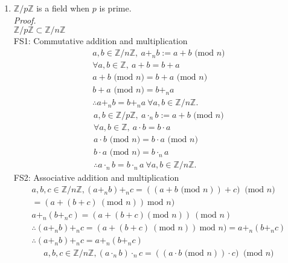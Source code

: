 \documentclass{article}
\begin{document}
\begin{enumerate}
\begin{enumerate}
        \vspace{5mm}
        \item $\mathbb{Z} / p\mathbb{Z}$ is a field when $p$ is prime. \\
        \textit{Proof.} \\
        $\mathbb{Z}/p\mathbb{Z} \subset \mathbb{Z}/n\mathbb{Z}$ \\
        FS1: Commutative addition and multiplication
        \begin{gather*}
            a, b \in \mathbb{Z}/n\mathbb{Z}, \ a +_n b := a + b \textrm{ (mod } n) \\
            \forall a,b \in \mathbb{Z}, \ a + b = b + a \\
            a + b \textrm{ (mod } n) = b + a \textrm{ (mod } n) \\
            b + a \textrm{ (mod } n) = b +_n a \\
            \therefore  a +_n b = b +_n a \ \forall a,b \in \mathbb{Z}/n\mathbb{Z}.
        \end{gather*}
        \begin{gather*}
            a, b \in \mathbb{Z}/p\mathbb{Z}, \ a \cdot_n b := a + b \textrm{ (mod } n) \\
            \forall a,b \in \mathbb{Z}, \ a \cdot b = b \cdot a \\
            a \cdot b \textrm{ (mod } n) = b \cdot a \textrm{ (mod } n) \\
            b \cdot a \textrm{ (mod } n) = b \cdot_n a \\
            \therefore  a \cdot_n b = b \cdot_n a \ \forall a,b \in \mathbb{Z}/n\mathbb{Z}.
        \end{gather*}
        FS2: Associative addition and multiplication
        \begin{gather*}
            a,b,c \in \mathbb{Z}/n\mathbb{Z}, (a +_n b) +_n c = ((a + b \textrm{ (mod } n)) + c)  \ \textrm{ (mod } n) \\
            = (a + (b+c) \  (\textrm{mod } n)) \ \textrm{mod } n) \\
            a +_n (b +_n c) = (a + (b + c) (\textrm{mod } n))\  (\textrm{mod } n) \\
            \therefore (a +_n b) +_n c = (a + (b+c) \  (\textrm{mod } n)) \ \textrm{mod } n) = a +_n (b+_n c) \\
            \therefore (a +_n b) +_n c = a +_n (b+_n c)
        \end{gather*}
        \begin{gather*}
            a,b,c \in \mathbb{Z}/n\mathbb{Z}, (a \cdot_n b) \cdot_n c = ((a \cdot b \textrm{ (mod } n)) \cdot c)  \ \textrm{ (mod } n) \\

\end{gather*}
\end{enumerate}
\end{enumerate}
\end{document}
